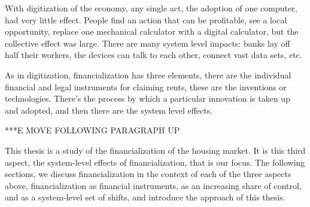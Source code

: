 With digitization of the economy, any single act, the adoption of one computer, had very little effect. People find an action that can be profitable, see a local opportunity, replace one mechanical calculator with a digital calculator,
but the collective effect was large. %
There are many system level impacts:
banks lay off half their workers, the devices can talk to each other, connect vast data sets, etc. %




As in digitization, financialization has three elements, there are the individual financial and legal instruments for claiming rents, these are the inventions or technologies.
There's the process by which a particular innovation is taken up and adopted, and then there are the system level effects. %
% 

***E MOVE FOLLOWING PARAGRAPH UP

This thesis is a study of the financialization of the housing market. It is this third aspect, the system-level effects of financialization, that is our focus. The following sections, we discuss financialization in the context of each of the three aspects above, financialization as financial instruments, as an increasing share of control, and as a system-level set of shifts, and introduce the approach of this thesis. 

